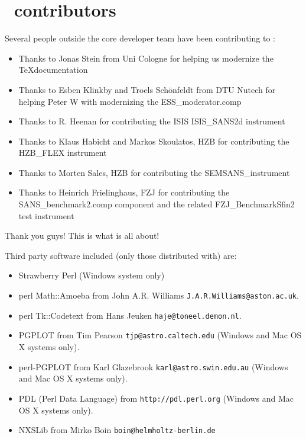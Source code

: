 \section*{\MCS \version\ contributors}
Several people outside the core developer team have been contributing
to \MCS \version:
\begin{itemize}
\item Thanks to Jonas Stein from Uni Cologne for helping us modernize the \TeX documentation
\item Thanks to Esben Klinkby and Troels Sch\"onfeldt from DTU Nutech for helping
  Peter W  with modernizing the ESS\_moderator.comp
\item Thanks to R. Heenan for contributing the ISIS ISIS\_SANS2d instrument 
\item Thanks to Klaus Habicht and Markos Skoulatos, HZB for
  contributing the HZB\_FLEX instrument
\item Thanks to Morten Sales, HZB  for contributing the SEMSANS\_instrument
\item Thanks to Heinrich Frielinghaus, FZJ for contributing the
  SANS\_benchmark2.comp component and the related FZJ\_BenchmarkSfin2 test instrument
\end{itemize}
Thank you guys! This is what \MCS is all about!

Third party software included (only those distributed with) \MCS are:
\begin{itemize}
\item Strawberry Perl (Windows system only)
\item perl Math::Amoeba from John A.R. Williams \verb+J.A.R.Williams@aston.ac.uk+.
\item perl Tk::Codetext from Hans Jeuken \verb+haje@toneel.demon.nl+.
\item PGPLOT from Tim Pearson \verb+tjp@astro.caltech.edu+ (Windows
  and Mac OS X systems only).
\item perl-PGPLOT from Karl Glazebrook \verb+karl@astro.swin.edu.au+ (Windows
  and Mac OS X systems only).
\item PDL (Perl Data Language) from \verb+http://pdl.perl.org+ (Windows
  and Mac OS X systems only).
\item NXSLib from Mirko Boin \verb+boin@helmholtz-berlin.de+
\end{itemize}

